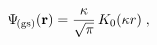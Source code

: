 \begin{equation}
\Psi_{\! {\rm (gs)}}
 ({\bf r})
=
\frac{\kappa}{ \sqrt{\pi} } \, K_{0} (\kappa r)
 \; ,
\label{eq:2D_ISP_wf_normalized_renormalized}
\end{equation}

